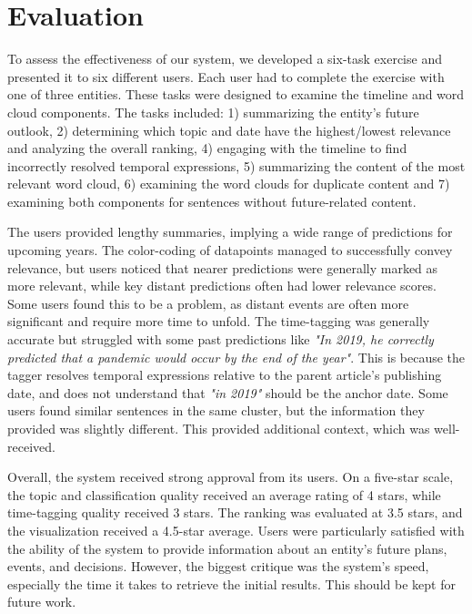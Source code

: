 \documentclass[sigconf]{acmart}
\begin{document}
\section{Evaluation}
To assess the effectiveness of our system, we developed a six-task exercise and presented it to six different users. Each user had to complete the exercise with one of three entities. These tasks were designed to examine the timeline and word cloud components. The tasks included: 1) summarizing the entity's future outlook, 2) determining which topic and date have the highest/lowest relevance and analyzing the overall ranking, 4) engaging with the timeline to find incorrectly resolved temporal expressions, 5) summarizing the content of the most relevant word cloud, 6) examining the word clouds for duplicate content and 7) examining both components for sentences without future-related content.

The users provided lengthy summaries, implying a wide range of predictions for upcoming years. The color-coding of datapoints managed to successfully convey relevance, but users noticed that nearer predictions were generally marked as more relevant, while key distant predictions often had lower relevance scores. Some users found this to be a problem, as distant events are often more significant and require more time to unfold. The time-tagging was generally accurate but struggled with some past predictions like \textit{"In 2019, he correctly predicted that a pandemic would occur by the end of the year"}. This is because the tagger resolves temporal expressions relative to the parent article's publishing date, and does not understand that \textit{"in 2019"} should be the anchor date. Some users found similar sentences in the same cluster, but the information they provided was slightly different. This provided additional context, which was well-received.

Overall, the system received strong approval from its users. On a five-star scale, the topic and classification quality received an average rating of 4 stars, while time-tagging quality received 3 stars. The ranking was evaluated at 3.5 stars, and the visualization received a 4.5-star average. Users were particularly satisfied with the ability of the system to provide information about an entity's future plans, events, and decisions. However, the biggest critique was the system's speed, especially the time it takes to retrieve the initial results. This should be kept for future work.

\end{document}

